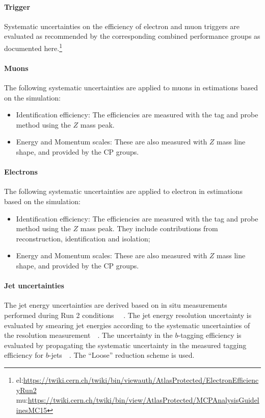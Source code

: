 \paragraph{Trigger}
Systematic uncertainties on the efficiency of electron and muon triggers are
evaluated as recommended by the corresponding combined performance groups as documented here.\footnote{el:\url{https://twiki.cern.ch/twiki/bin/viewauth/AtlasProtected/ElectronEfficiencyRun2} \\ mu:\url{https://twiki.cern.ch/twiki/bin/view/AtlasProtected/MCPAnalysisGuidelinesMC15}} 

\paragraph{Muons}
The following systematic uncertainties are applied to muons in estimations based on the simulation:

\begin{itemize}
\item Identification efficiency: The efficiencies are measured with the tag and probe method using the $Z$ mass peak.
\item Energy and Momentum scales: These are also measured with $Z$ mass line shape, and provided by the CP groups. 
\end{itemize}

\paragraph{Electrons}

The following systematic uncertainties are applied to electron in estimations based on the simulation:

\begin{itemize}
\item Identification efficiency: The efficiencies are measured with
  the tag and probe method using the $Z$ mass peak. They include
  contributions from reconstruction, identification and isolation;
\item Energy and Momentum scales: These are also measured with $Z$ mass line shape, and provided by the CP groups. 
\end{itemize}

\paragraph{Jet uncertainties}
The jet energy uncertainties are derived based on in situ measurements
performed during Run 2 conditions ~~\cite{ATL-PHYS-PUB-2015-015}. The jet energy
resolution uncertainty is evaluated by smearing jet energies according
to the systematic uncertainties of the resolution
measurement~~\cite{Aad:2014bia}. The uncertainty in the $b$-tagging
efficiency is evaluated by propagating the systematic uncertainty in
the measured tagging efficiency for
$b$-jets~~\cite{ATLAS-CONF-2014-004}. The ``Loose'' reduction scheme
is used.


